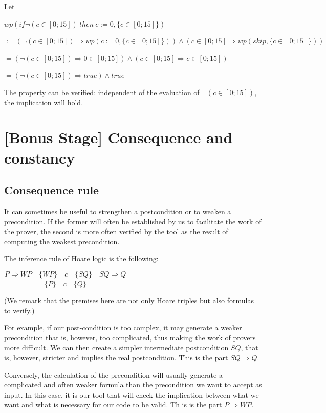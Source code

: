 \documentclass[12pt,francais,]{scrbook}
\begin{document}
Let

\(wp(if \neg (c \in [0;15])\ then\ c := 0, \{c \in [0;15]\})\)

\(:= (\neg (c \in [0;15])\Rightarrow wp(c := 0, \{c \in [0;15]\})) \wedge (c \in [0;15]\Rightarrow wp(skip, \{c \in [0;15]\}))\)

\(= (\neg (c \in [0;15]) \Rightarrow 0 \in [0;15]) \wedge (c \in [0;15] \Rightarrow c \in [0;15])\)

\(= (\neg (c \in [0;15]) \Rightarrow true) \wedge true\)

The property can be verified: independent of the evaluation of
\(\neg (c \in [0;15])\), the implication will hold.

\section{{[}Bonus Stage{]} Consequence and
constancy}\label{bonus-stage-consequence-and-constancy}

\subsection{Consequence rule}\label{consequence-rule}

It can sometimes be useful to strengthen a postcondition or to weaken a
precondition. If the former will often be established by us to
facilitate the work of the prover, the second is more often verified by
the tool as the result of computing the weakest precondition.

The inference rule of Hoare logic is the following:

\begin{center}\(\dfrac{P \Rightarrow WP \quad \{WP\}\quad c\quad \{SQ\} \quad SQ \Rightarrow Q}{\{P\}\quad c \quad \{Q\}}\)\end{center}

(We remark that the premises here are not only Hoare triples but also
formulas to verify.)

For example, if our post-condition is too complex, it may generate a
weaker precondition that is, however, too complicated, thus making the
work of provers more difficult. We can then create a simpler
intermediate postcondition \(SQ\), that is, however, stricter and
implies the real postcondition. This is the part \(SQ \Rightarrow Q\).

Conversely, the calculation of the precondition will usually generate a
complicated and often weaker formula than the precondition we want to
accept as input. In this case, it is our tool that will check the
implication between what we want and what is necessary for our code to
be valid. Th is is the part \(P \Rightarrow WP\).
\end{document}
